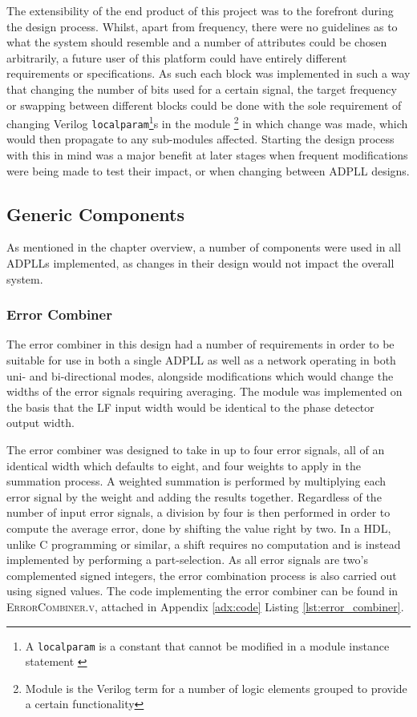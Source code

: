 The extensibility of the end product of this project was to the forefront during the design process. Whilst, apart from frequency, there were no guidelines as to what the system should resemble and a number of attributes could be chosen arbitrarily, a future user of this platform could have entirely different requirements or specifications. As such each block was implemented in such a way that changing the number of bits used for a certain signal, the target frequency or swapping between different blocks could be done with the sole requirement of changing Verilog \texttt{localparam}\footnote{A \texttt{localparam} is a constant that cannot be modified in a module instance statement \cite{hdlworks}}s in the module \footnote{Module is the Verilog term for a number of logic elements grouped to provide a certain functionality} in which change was made, which would then propagate to any sub-modules affected. Starting the design process with this in mind was a major benefit at later stages when frequent modifications were being made to test their impact, or when changing between \ac{ADPLL} designs.

\subsection{Generic Components}
As mentioned in the chapter overview, a number of components were used in all \ac{ADPLL}s implemented, as changes in their design would not impact the overall system.
\subsubsection{Error Combiner}
The error combiner in this design had a number of requirements in order to be suitable for use in both a single \ac{ADPLL} as well as a network operating in both uni- and bi-directional modes, alongside modifications which would change the widths of the error signals requiring averaging. The module was implemented on the basis that the \ac{LF} input width would be identical to the phase detector output width.

The error combiner was designed to take in up to four error signals, all of an identical width which defaults to eight, and four weights to apply in the summation process. A weighted summation is performed by multiplying each error signal by the weight and adding the results together. Regardless of the number of input error signals, a division by four is then performed in order to compute the average error, done by shifting the value right by two. In a \ac{HDL}, unlike C programming or similar, a shift requires no computation and is instead implemented by performing a part-selection. As all error signals are two's complemented signed integers, the error combination process is also carried out using signed values. The code implementing the error combiner can be found in \textsc{ErrorCombiner.v}, attached in Appendix \ref{adx:code} Listing \ref{lst:error_combiner}.

